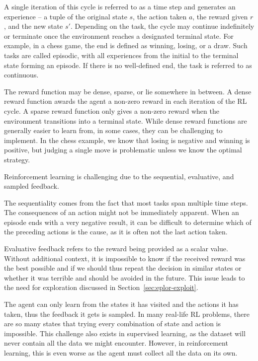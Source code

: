 \documentclass[
  digital,     %
  oneside,     %
  nosansbold,  %
  nocolorbold, %
  lof,         %
  lot,         %
]{fithesis4}
\begin{document}
A single iteration of this cycle is referred to as a time step and generates an experience -- a tuple of the original state $s$, the action taken $a$, the reward given $r$, and the new state $s'$. Depending on the task, the cycle may continue indefinitely or terminate once the environment reaches a designated terminal state. For example, in a chess game, the end is defined as winning, losing, or a draw. Such tasks are called episodic, with all experiences from the initial to the terminal state forming an episode. If there is no well-defined end, the task is referred to as continuous.

The reward function may be dense, sparse, or lie somewhere in between. A dense reward function awards the agent a non-zero reward in each iteration of the RL cycle. A sparse reward function only gives a non-zero reward when the environment transitions into a terminal state. While dense reward functions are generally easier to learn from, in some cases, they can be challenging to implement. In the chess example, we know that losing is negative and winning is positive, but judging a single move is problematic unless we know the optimal strategy.

Reinforcement learning is challenging due to the sequential, evaluative, and sampled feedback.

The sequentiality comes from the fact that most tasks span multiple time steps. The consequences of an action might not be immediately apparent. When an episode ends with a very negative result, it can be difficult to determine which of the preceding actions is the cause, as it is often not the last action taken.

Evaluative feedback refers to the reward being provided as a scalar value. Without additional context, it is impossible to know if the received reward was the best possible and if we should thus repeat the decision in similar states or whether it was terrible and should be avoided in the future. This issue leads to the need for exploration discussed in Section~\ref{sec:eplor-exploit}.

The agent can only learn from the states it has visited and the actions it has taken, thus the feedback it gets is sampled. In many real-life RL problems, there are so many states that trying every combination of state and action is impossible. This challenge also exists in supervised learning, as the dataset will never contain all the data we might encounter. However, in reinforcement learning, this is even worse as the agent must collect all the data on its own.
\end{document}
